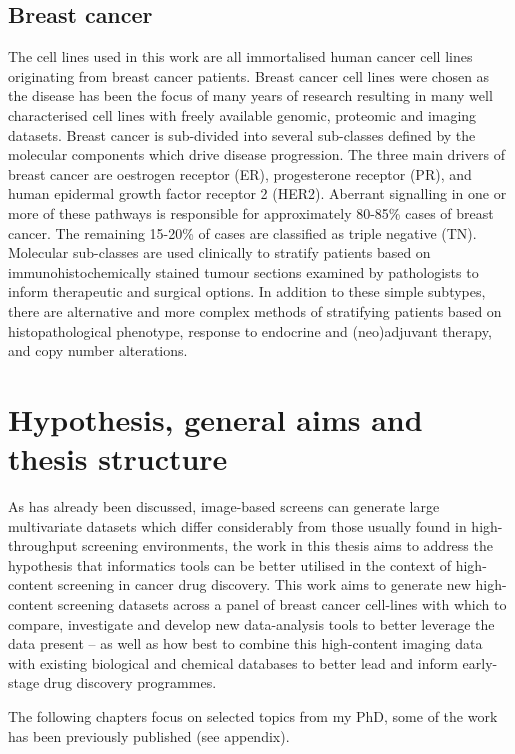 \documentclass[a4paper,11pt,twoside,openright]{scrbook}
\begin{document}
\subsection{Breast cancer}

The cell lines used in this work are all immortalised human cancer cell lines originating from breast cancer patients.
Breast cancer cell lines were chosen as the disease has been the focus of many years of research resulting in many well 
characterised cell lines with freely available genomic, proteomic and imaging datasets.
Breast cancer is sub-divided into several sub-classes defined by the molecular components which drive disease 
progression.
The three main drivers of breast cancer are oestrogen receptor (ER), progesterone receptor (PR), and human epidermal 
growth factor receptor 2 (HER2).
Aberrant signalling in one or more of these pathways is responsible for approximately 80-85\% cases of breast cancer.
The remaining 15-20\% of cases are classified as triple negative (TN).
Molecular sub-classes are used clinically to stratify patients based on immunohistochemically stained tumour sections 
examined by pathologists to inform therapeutic and surgical options.
In addition to these simple subtypes, there are alternative and more complex methods of stratifying patients based on 
histopathological phenotype, response to endocrine and (neo)adjuvant therapy, and copy number alterations. 
\cite{Sims2007}


\section{Hypothesis, general aims and thesis structure}

As has already been discussed, image-based screens can generate large multivariate datasets which differ considerably 
from those usually found in high-throughput screening environments, the work in this thesis aims to address the 
hypothesis that informatics tools can be better utilised in the context of high-content screening in cancer drug 
discovery.
This work aims to generate new high-content screening datasets across a panel of breast cancer cell-lines with which to 
compare, investigate and develop new data-analysis tools to better leverage the data present -- as well as how best to 
combine this high-content imaging data with existing biological and chemical databases to better lead and inform 
early-stage drug discovery programmes.

The following chapters focus on selected topics from my PhD, some of the work has been previously published (see 
appendix).
\end{document}
